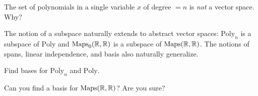 \begin{qbox}
  The set of polynomials in a single variable $x$ of degree $= n$ is \emph{not} a vector space. Why?
\end{qbox}

The notion of a subspace naturally extends to abstract vector spaces: $\mathrm{Poly}_n$ is a subspace of $\mathrm{Poly}$ and $\operatorname{Maps}_0(\mathbb{R},\mathbb{R})$ is a subspace of $\operatorname{Maps}(\mathbb{R},\mathbb{R})$.
The notions of spans, linear independence, and basis also naturally generalize.

\begin{qbox}
  Find bases for $\mathrm{Poly}_n$ and $\mathrm{Poly}$.
\end{qbox}

\begin{qbox}
  Can you find a basis for $\operatorname{Maps}(\mathbb{R},\mathbb{R})$? Are you sure?
\end{qbox}
